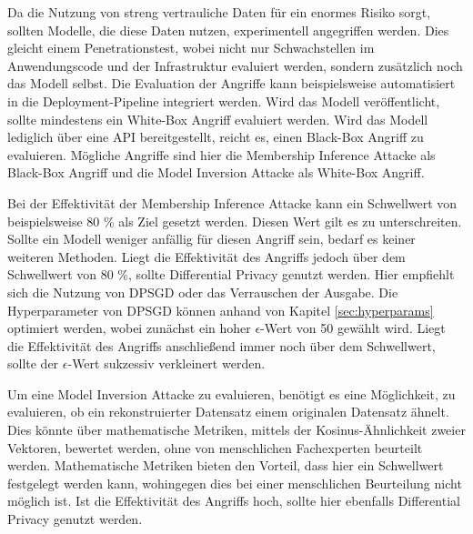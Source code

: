 Da die Nutzung von streng vertrauliche Daten für ein enormes Risiko sorgt, sollten Modelle, die diese Daten nutzen, experimentell angegriffen werden.
Dies gleicht einem Penetrationstest, wobei nicht nur Schwachstellen im Anwendungscode und der Infrastruktur evaluiert werden, sondern zusätzlich noch das Modell selbst.
Die Evaluation der Angriffe kann beispielsweise automatisiert in die Deployment-Pipeline integriert werden.
Wird das Modell veröffentlicht, sollte mindestens ein White-Box Angriff evaluiert werden.
Wird das Modell lediglich über eine API bereitgestellt, reicht es, einen Black-Box Angriff zu evaluieren.
Mögliche Angriffe sind hier die Membership Inference Attacke als Black-Box Angriff und die Model Inversion Attacke als White-Box Angriff.

Bei der Effektivität der Membership Inference Attacke kann ein Schwellwert von beispielsweise 80 \% als Ziel gesetzt werden. 
Diesen Wert gilt es zu unterschreiten. 
Sollte ein Modell weniger anfällig für diesen Angriff sein, bedarf es keiner weiteren Methoden.
Liegt die Effektivität des Angriffs jedoch über dem Schwellwert von 80 \%, sollte Differential Privacy genutzt werden.
Hier empfiehlt sich die Nutzung von DPSGD oder das Verrauschen der Ausgabe.
Die Hyperparameter von DPSGD können anhand von Kapitel \ref{sec:hyperparams} optimiert werden, wobei zunächst ein hoher $\epsilon$-Wert von 50 gewählt wird.
Liegt die Effektivität des Angriffs anschließend immer noch über dem Schwellwert, sollte der $\epsilon$-Wert sukzessiv verkleinert werden.

Um eine Model Inversion Attacke zu evaluieren, benötigt es eine Möglichkeit, zu evaluieren, ob ein rekonstruierter Datensatz einem originalen Datensatz ähnelt.
Dies könnte über mathematische Metriken, \zB mittels der Kosinus-Ähnlichkeit zweier Vektoren, bewertet werden, ohne von menschlichen Fachexperten beurteilt werden.
Mathematische Metriken bieten den Vorteil, dass hier ein Schwellwert festgelegt werden kann, wohingegen dies bei einer menschlichen Beurteilung nicht möglich ist.
Ist die Effektivität des Angriffs hoch, sollte hier ebenfalls Differential Privacy genutzt werden.


